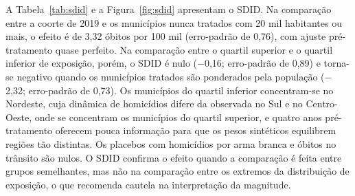 \documentclass[11pt,a4paper]{article}
\begin{document}
A Tabela~\ref{tab:sdid} e a Figura~\ref{fig:sdid} apresentam o SDID. Na comparação entre a coorte de 2019 e os municípios nunca tratados com 20 mil habitantes ou mais, o efeito é de 3{,}32 óbitos por 100 mil (erro-padrão de 0{,}76), com ajuste pré-tratamento quase perfeito. Na comparação entre o quartil superior e o quartil inferior de exposição, porém, o SDID é nulo ($-$0{,}16; erro-padrão de 0{,}89) e torna-se negativo quando os municípios tratados são ponderados pela população ($-$2{,}32; erro-padrão de 0{,}73). Os municípios do quartil inferior concentram-se no Nordeste, cuja dinâmica de homicídios difere da observada no Sul e no Centro-Oeste, onde se concentram os municípios do quartil superior, e quatro anos pré-tratamento oferecem pouca informação para que os pesos sintéticos equilibrem regiões tão distintas. Os placebos com homicídios por arma branca e óbitos no trânsito são nulos. O SDID confirma o efeito quando a comparação é feita entre grupos semelhantes, mas não na comparação entre os extremos da distribuição de exposição, o que recomenda cautela na interpretação da magnitude.
\end{document}
